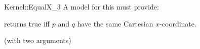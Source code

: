\begin{ccRefFunctionObjectConcept}{Kernel::EqualX_3}
A model for this must provide:


{returns true iff $p$ and $q$ have the same Cartesian $x$-coordinate.}

\ccRefines
{} (with two arguments)

\ccSeeAlso
{}\\

\end{ccRefFunctionObjectConcept}
